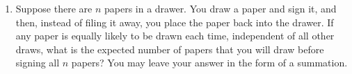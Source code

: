 \documentclass[10pt]{article}
\begin{document}
\begin{enumerate}


\item Suppose there are $n$ papers in a drawer. You draw a paper and sign it, and  then, instead of filing it away, you place the paper back into the drawer. If any paper is equally likely to be drawn each time, independent of all other draws, what is the expected number of papers that you will draw before signing all $n$ papers? You may leave your answer in the form of a summation.
\end{enumerate}
\end{document}
